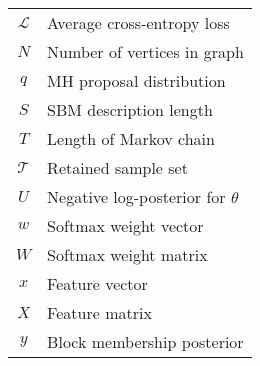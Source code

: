 \begin{table}[!h]
\begin{tabular}{c|l}
			  $\mathcal{L}$ & Average cross-entropy loss\\
			  $N$ & Number of vertices in graph \\
			  $q$ & MH proposal distribution\\
			  $S$ & SBM description length\\
			  $T$ & Length of Markov chain\\
			  $\mathcal{T}$ & Retained sample set\\
			  $U$ & Negative log-posterior for $\theta$ \\
			  $w$ & Softmax weight vector\\
			  $W$ & Softmax weight matrix\\
			  $x$ & Feature vector \\
			  $X$ & Feature matrix \\
			  $y$ & Block membership posterior \\
	\end{tabular}
\end{table}